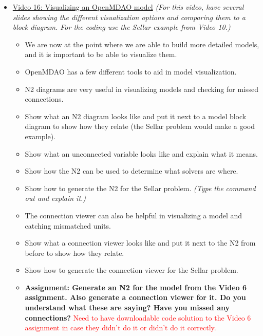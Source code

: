 \documentclass[12pt, letterpaper]{article}
\begin{document}
\begin{itemize}
	\item \underline{Video 16: Visualizing an OpenMDAO model} \textit{(For this video, have several slides showing the different visualization options and comparing them to a block diagram. For the coding use the Sellar example from Video 10.)}
		\begin{itemize}
			\item We are now at the point where we are able to build more detailed models, and it is important to be able to visualize them.
			\item OpenMDAO has a few different tools to aid in model visualization.
			\item N2 diagrams are very useful in visualizing models and checking for missed connections.
			\item Show what an N2 diagram looks like and put it next to a model block diagram to show how they relate (the Sellar problem would make a good example).
			\item Show what an unconnected variable looks like and explain what it means.
			\item Show how the N2 can be used to determine what solvers are where.
			\item Show how to generate the N2 for the Sellar problem. \textit{(Type the command out and explain it.)}
			\item The connection viewer can also be helpful in visualizing a model and catching mismatched units.
			\item Show what a connection viewer looks like and put it next to the N2 from before to show how they relate.
			\item Show how to generate the connection viewer for the Sellar problem.
			\item \textbf{Assignment: Generate an N2 for the model from the Video 6 assignment. Also generate a connection viewer for it. Do you understand what these are saying? Have you missed any connections?} \textcolor{red}{Need to have downloadable code solution to the Video 6 assignment in case they didn't do it or didn't do it correctly.}
		\end{itemize}


\end{itemize}
\end{document}
